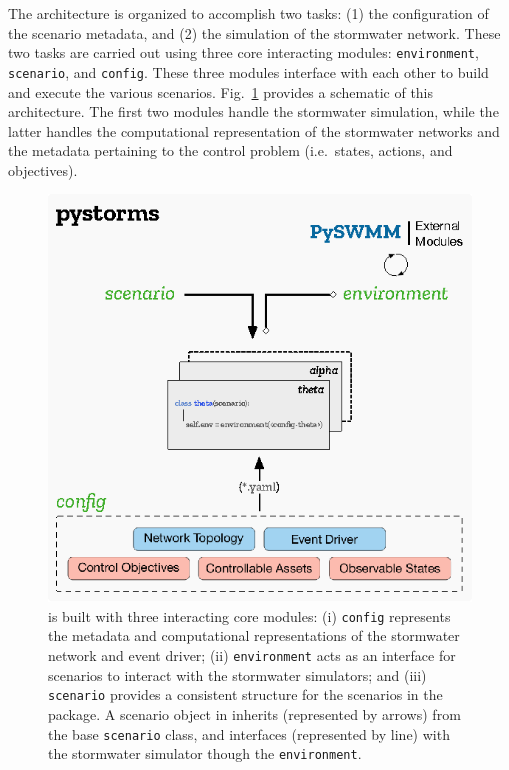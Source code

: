 The \pystorms architecture is organized to accomplish two tasks: (1) the configuration of the scenario metadata, and (2) the simulation of the stormwater network. These two tasks are carried out using three core interacting modules: \texttt{environment}, \texttt{scenario}, and \texttt{config}. These three modules interface with each other to build and execute the various scenarios. Fig.~\ref{fig:arch} provides a schematic of this architecture. The first two modules handle the stormwater simulation, while the latter handles the computational representation of the stormwater networks and the metadata pertaining to the control problem (i.e.\ states, actions, and objectives). 
%
%
%
\begin{figure}[ht]
    \centering
	\includegraphics[width=\linewidth]{gfx/Chapter-5/pystorms_architectire_fin.eps}
	\caption{\pystorms is built with three interacting core modules: (i) \texttt{config} represents the metadata and computational representations of the stormwater network and event driver; (ii) \texttt{environment} acts as an interface for scenarios to interact with the stormwater simulators; and (iii) \texttt{scenario} provides a consistent structure for the scenarios in the package. A scenario object in \pystorms inherits (represented by arrows) from the base \texttt{scenario} class, and interfaces (represented by line) with the stormwater simulator though the \texttt{environment}. }\label{fig:arch}
\end{figure}
%
%
%

